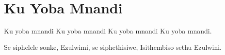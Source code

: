 \starttocol
\chapter{Ku Yoba Mnandi}
\nexttocol
\hfill{\it }
\stoptocol
\starttocol
\startlines
{\sc Ku} yoba mnandi
Ku yoba mnandi
Ku yoba mnandi
Ku yoba mnandi.

Se siphelele sonke,
Ezulwimi, se siphethisiwe,
Isithembiso sethu
Ezulwini.
\stoplines
\nexttocol

\stoptocol
